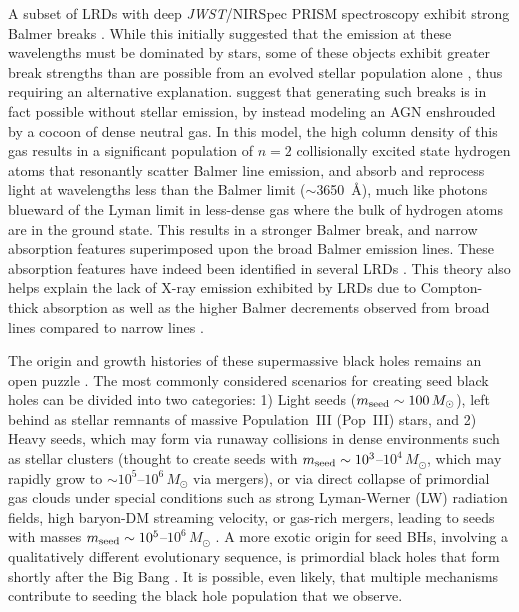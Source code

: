 \documentclass[twocolumn]{aastex7}
\begin{document}
A subset of LRDs with deep  \textit{JWST}/NIRSpec PRISM spectroscopy exhibit strong Balmer breaks \citep[e.g.,][]{wang24, setton24}. While this initially suggested that the emission at these wavelengths must be dominated by stars, some of these objects exhibit greater break strengths than are possible from an evolved stellar population alone \citep[e.g.,][]{Williams24,labbe24,ji25,degraaff25,naidu25}, thus requiring an alternative explanation. \cite{inayoshi25} suggest that generating such breaks is in fact possible without stellar emission, by instead modeling an AGN enshrouded by a cocoon of dense neutral gas. In this model, the high column density of this gas results in a significant population of $n=2$ collisionally excited state hydrogen atoms that resonantly scatter Balmer line emission, and absorb and reprocess light at wavelengths less than the Balmer limit ($\sim$3650~\AA{}), much like photons blueward of the Lyman limit in less-dense gas where the bulk of hydrogen atoms are in the ground state. This results in a stronger Balmer break, and narrow absorption features superimposed upon the broad Balmer emission lines. These absorption features have indeed been identified in several LRDs \citep{matthee24,kocevski25,taylor24,wang24a,ji25,degraaff25,rusakov25,naidu25}. This theory also helps explain the lack of X-ray emission exhibited by LRDs due to Compton-thick absorption \citep{kocevski25,yue24xray,maiolino25} as well as the higher Balmer decrements observed from broad lines compared to narrow lines \citep[e.g.,][]{brooks24,naidu25}. 

The origin and growth histories of these supermassive black holes remains an open puzzle \citep{Inayoshi2020,Volonteri2021}. The most commonly considered scenarios for creating seed black holes can be divided into two categories: 1) Light seeds ($m_{\rm seed} \sim 100\,M_{\odot}$), left behind as stellar remnants of massive Population~III (Pop~III) stars, and 2) Heavy seeds, which may form via runaway collisions in dense environments such as stellar clusters (thought to create seeds with $m_{\rm seed} \sim 10^3$--$10^4\, M_{\odot}$, which may rapidly grow to $\sim 10^5$--$10^6\,M_{\odot}$ via mergers), or via direct collapse of primordial gas clouds under special conditions such as strong Lyman-Werner (LW) radiation fields, high baryon-DM streaming velocity, or gas-rich mergers, leading to seeds with masses $m_{\rm seed} \sim 10^5$--$10^6\,M_{\odot}$ \citep[see review by][and references therein]{Inayoshi2020}. A more exotic origin for seed BHs, involving a qualitatively different evolutionary sequence, is primordial black holes that form shortly after the Big Bang \citep[e.g.,][]{LiuBromm2022,Zhang_PBH2025,Ziparo_PBH2025,Matteri2025}. It is possible, even likely, that multiple mechanisms contribute to seeding the black hole population that we observe. 
\end{document}
